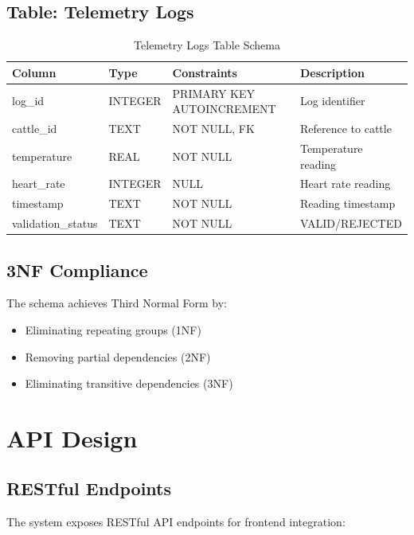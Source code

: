 \subsection{Table: Telemetry Logs}

\begin{table}[H]
\centering
\begin{tabular}{|l|l|l|l|}
\hline
\textbf{Column} & \textbf{Type} & \textbf{Constraints} & \textbf{Description} \\
\hline
log\_id & INTEGER & PRIMARY KEY AUTOINCREMENT & Log identifier \\
cattle\_id & TEXT & NOT NULL, FK & Reference to cattle \\
temperature & REAL & NOT NULL & Temperature reading \\
heart\_rate & INTEGER & NULL & Heart rate reading \\
timestamp & TEXT & NOT NULL & Reading timestamp \\
validation\_status & TEXT & NOT NULL & VALID/REJECTED \\
\hline
\end{tabular}
\caption{Telemetry Logs Table Schema}
\end{table}

\subsection{3NF Compliance}

The schema achieves Third Normal Form by:

\begin{itemize}
    \item Eliminating repeating groups (1NF)
    \item Removing partial dependencies (2NF)
    \item Eliminating transitive dependencies (3NF)
\end{itemize}

\section{API Design}

\subsection{RESTful Endpoints}

The system exposes RESTful API endpoints for frontend integration:

